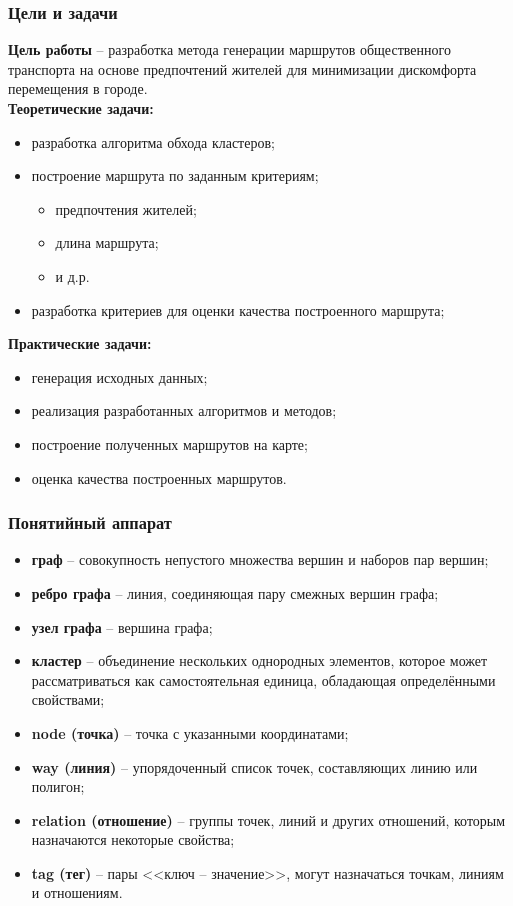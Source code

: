 \begin{frame} %
    \frametitle{Цели и задачи}
    \textbf{Цель работы} -- разработка метода генерации маршрутов общественного 
    транспорта на основе предпочтений жителей для минимизации дискомфорта 
    перемещения в городе. \\
    \textbf{Теоретические задачи:}
    \begin{itemize}
        \item разработка алгоритма обхода кластеров;
        \item построение маршрута по заданным критериям;
        \begin{itemize}
            \item предпочтения жителей;
            \item длина маршрута;
            \item и д.р.
        \end{itemize}
        \item разработка критериев для оценки качества построенного маршрута;
    \end{itemize}
    \textbf{Практические задачи:}
    \begin{itemize}
        \item генерация исходных данных;
        \item реализация разработанных алгоритмов и методов;
        \item построение полученных маршрутов на карте;
        \item оценка качества построенных маршрутов.
    \end{itemize}
\end{frame}

\begin{frame} %
    \frametitle{Понятийный аппарат}
    \small
    \begin{itemize}
        \itemsep-5pt
        \item \textbf{граф} -- совокупность непустого множества вершин и наборов пар вершин;
        \item \textbf{ребро графа} -- линия, соединяющая пару смежных вершин графа; 
        \item \textbf{узел графа} -- вершина графа;
        \item \textbf{кластер} -- объединение нескольких однородных элементов, которое может 
            рассматриваться как самостоятельная единица, обладающая определёнными свойствами;
        \item \textbf{node (точка)} -- точка с указанными координатами;
        \item \textbf{way (линия)} -- упорядоченный список точек, составляющих линию или полигон;
        \item \textbf{relation (отношение)} -- группы точек, линий и других отношений, которым назначаются 
            некоторые свойства;
        \item \textbf{tag (тег)} -- пары <<ключ -- значение>>, могут назначаться точкам, линиям и отношениям.
    \end{itemize}
\end{frame}

